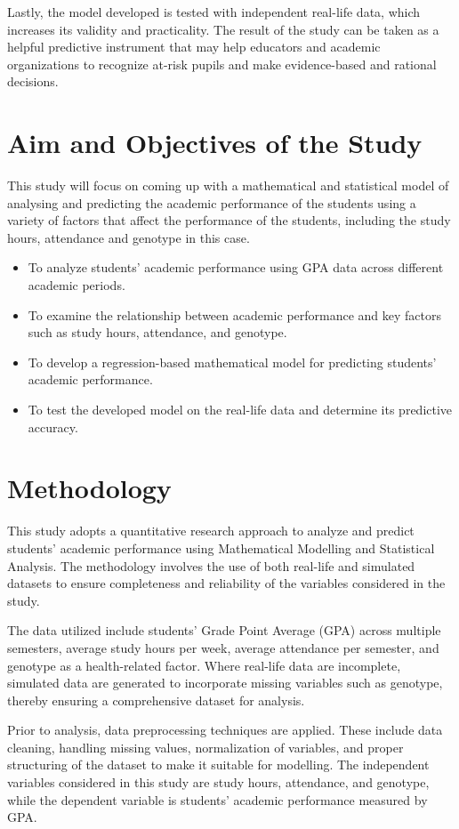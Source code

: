 \documentclass[12pt]{report}
\begin{document}
	Lastly, the model developed is tested with independent real-life data, which increases its validity and practicality. The result of the study can be taken as a helpful predictive instrument that may help educators and academic organizations to recognize at-risk pupils and make evidence-based and rational decisions.
	
	\section{Aim and Objectives of the Study}
	This study will focus on coming up with a mathematical and statistical model of analysing and predicting the academic performance of the students using a variety of factors that affect the performance of the students, including the study hours, attendance and genotype in this case.
	
	\begin{itemize}
		\item To analyze students’ academic performance using GPA data across different academic periods.
		\item To examine the relationship between academic performance and key factors such as study hours, attendance, and genotype.
		\item To develop a regression-based mathematical model for predicting students’ academic performance.
		\item To test the developed model on the real-life data and determine its predictive accuracy.
	\end{itemize}
	
	\section{Methodology}
	This study adopts a quantitative research approach to analyze and predict students’ academic performance using Mathematical Modelling and Statistical Analysis. The methodology involves the use of both real-life and simulated datasets to ensure completeness and reliability of the variables considered in the study.
	
	The data utilized include students’ Grade Point Average (GPA) across multiple semesters, average study hours per week, average attendance per semester, and genotype as a health-related factor. Where real-life data are incomplete, simulated data are generated to incorporate missing variables such as genotype, thereby ensuring a comprehensive dataset for analysis.
	
	Prior to analysis, data preprocessing techniques are applied. These include data cleaning, handling missing values, normalization of variables, and proper structuring of the dataset to make it suitable for modelling. The independent variables considered in this study are study hours, attendance, and genotype, while the dependent variable is students’ academic performance measured by GPA.
	
\end{document}

